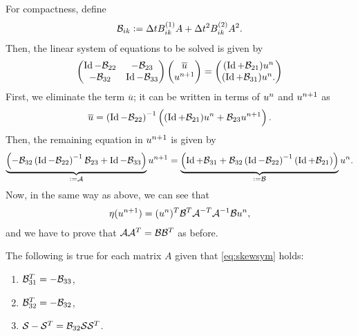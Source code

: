 \documentclass[]{scrartcl}
\numberwithin{equation}{section}
\begin{document}
%
For compactness, define
\begin{align*}
 \mathcal{B}_{ik} := \Delta t B^{(1)}_{ik} A + \Delta t^2 B^{(2)}_{ik} A^2.
\end{align*}
%
Then, the linear system of equations to be solved is given by
\begin{align*}
\begin{pmatrix}
 \Id - \B_{22} & - \B_{23} \\
 -\B_{32} & \Id - \B_{33}
\end{pmatrix}
%
\begin{pmatrix}
 \overline u \\ \ynn
\end{pmatrix}
=
\begin{pmatrix}
 (\Id + \B_{21})\yn \\ (\Id + \B_{31})\yn.
\end{pmatrix}
\end{align*}
%
First, we eliminate the term $\overline u$; it can be written in terms of $u^n$ and $u^{n+1}$ as
\begin{align*}
 \overline u = \left(\operatorname{Id} - \mathcal{B}_{22}\right)^{-1}\left((\operatorname{Id} + \mathcal{B}_{21}) u^n + \mathcal{B}_{23} u^{n+1}\right).
\end{align*}
%
Then, the remaining equation in $u^{n+1}$ is given by
%
\begin{align*}
 \underbrace{\left(-\mathcal{B}_{32} \left(\operatorname{Id} - \mathcal{B}_{22}\right)^{-1} \mathcal{B}_{23} + \operatorname{Id} - \mathcal{B}_{33} \right)}_{:=\mathcal{A}}u^{n+1} =
 \underbrace{\left(\operatorname{Id} + \mathcal{B}_{31} + \mathcal{B}_{32} \left(\operatorname{Id} - \mathcal{B}_{22}\right)^{-1}(\operatorname{Id} + \mathcal{B}_{21}) \right)}_{:=\mathcal{B}} u^n.
\end{align*}
%
Now, in the same way as above, we can see that
\begin{align*}
 \eta(u^{n+1}) = (u^n)^T \mathcal{B}^T \mathcal{A}^{-T} \mathcal{A}^{-1} \mathcal{B} u^n,
\end{align*}
%
and we have to prove that $\mathcal{A} \mathcal{A}^T = \mathcal{B} \mathcal{B}^T$ as before.

\begin{lemma}
 The following is true for each matrix $A$ given that \eqref{eq:skewsym} holds:
 \begin{enumerate}
  \item $\mathcal{B}_{31}^T = -\mathcal{B}_{33}$,
  \item $\mathcal{B}_{32}^T = -\mathcal{B}_{32}$,
  \item $\mathcal{S}-\mathcal{S}^T = \mathcal{B}_{32}\mathcal{S}\mathcal{S}^T$.
 \end{enumerate}

\end{lemma}
\end{document}
